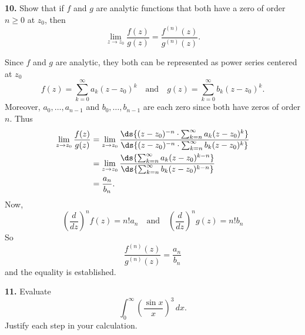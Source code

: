 \documentclass{homework}
\begin{document}
{\bf 10.} Show that if $f$ and $g$ are analytic functions that both have a zero of order $n\ge 0$ at $z_0$, then 
$$
  \lim_{z\to z_0}\frac{f(z)}{g(z)} = \frac{f^{(n)}(z)}{g^{(n)}(z)}.
$$

\begin{solution}
  Since $f$ and $g$ are analytic, they both can be represented as power series centered at $z_0$
  $$
    f(z) = \sum_{k=0}^\infty a_k(z-z_0)^k\quad\text{and}\quad g(z)= \sum_{k=0}^\infty b_k(z-z_0)^k.
  $$
  Moreover, $a_0,\dots,a_{n-1}$ and $b_0,\dots,b_{n-1}$ are each zero since both have zeros of order $n$.
  Thus
  \begin{align*}
    \lim_{z\to z_0}\frac{f(z)}{g(z)} 
    &= \lim_{z\to z_0} \frac{\ds{(z-z_0)^{-n} \cdot \sum_{k=n}^\infty a_k(z-z_0)^k}}{\ds{(z-z_0)^{-n} \cdot \sum_{k=n}^\infty b_k(z-z_0)^k}}\\
    &= \lim_{z\to z_0} \frac{\ds{\sum_{k=n}^\infty a_k(z-z_0)^{k-n}}}{\ds{\sum_{k=n}^\infty b_k(z-z_0)^{k-n}}}\\
    &= \frac{a_n}{b_n}.
  \end{align*}
  Now, 
  $$
    \left(\frac{d}{dz}\right)^nf(z) = n!a_n \quad\text{and}\quad\left(\frac{d}{dz}\right)^ng(z) = n!b_n
  $$
  So 
  $$
    \frac{f^{(n)}(z)}{g^{(n)}(z)} = \frac{a_n}{b_n}
  $$
  and the equality is established.
\end{solution}

{\bf 11.} Evaluate 
$$
  \int_0^\infty \left(\frac{\sin x}{x}\right)^3\,dx.
$$
Justify each step in your calculation.
\end{document}
